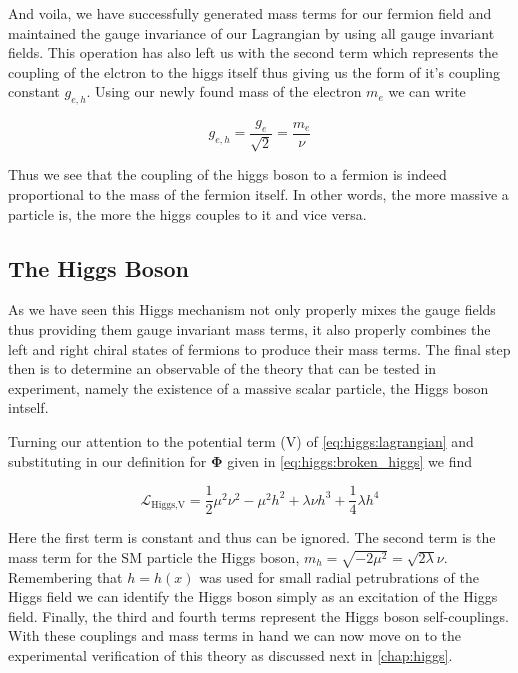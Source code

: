 And voila, we have successfully generated mass terms for our fermion field and
maintained the gauge invariance of our Lagrangian by using all gauge invariant
fields.  This operation has also left us with the second term which represents the coupling
of the elctron to the higgs itself thus giving us the form of it's coupling
constant $g_{e,h}$.  Using our newly found mass of the electron $m_{e}$ we can
write

\begin{equation}
g_{e,h} = \frac{g_{e}}{\sqrt{2}} = \frac{m_{e}}{\nu}
\end{equation}

Thus we see that the coupling of the higgs boson to a fermion is indeed
proportional to the mass of the fermion itself.  In other words, the more
massive a particle is, the more the higgs couples to it and vice versa.
 
\subsection{The Higgs Boson}

As we have seen this Higgs mechanism not only properly mixes the gauge fields
thus providing them gauge invariant mass terms, it also properly combines the
left and right chiral states of fermions to produce their mass terms.  The final
step then is to determine an observable of the theory that can be tested in
experiment, namely the existence of a massive scalar particle, the Higgs boson
intself.

Turning our attention to the potential term (V) of
\cref{eq:higgs:lagrangian} and substituting in our definition for
$\boldsymbol{\Phi}$ given in \cref{eq:higgs:broken_higgs} we find

\begin{equation}
\mathcal{L}_\text{Higgs,V} = \frac{1}{2} \mu^{2} \nu^{2} - \mu^{2} h^{2} +
\lambda \nu h^{3} + \frac{1}{4} \lambda h^{4}
\end{equation}

Here the first term is constant and thus can be ignored.  The second term is the
mass term for the SM particle the Higgs boson, $m_h = \sqrt{-2\mu^{2}} =
\sqrt{2\lambda}\nu$. Remembering that $h = h(x)$ was used for small radial
petrubrations of the Higgs field we can identify the Higgs boson simply as an
excitation of the Higgs field.  Finally, the third and fourth terms represent
the Higgs boson self-couplings.  With these couplings and mass terms in hand we
can now move on to the experimental verification of this theory as discussed
next in \cref{chap:higgs}.

